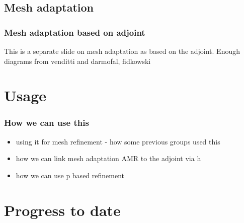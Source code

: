 \documentclass{beamer}
\begin{document}

\subsection{Mesh adaptation}
\begin{frame}
\scriptsize
\frametitle{Mesh adaptation based on adjoint}
This is a separate slide on mesh adaptation as based on the adjoint. Enough diagrams from venditti and darmofal, fidkowski
\end{frame}




\section[Usage]{Usage}

\begin{frame}%
\frametitle{How we can use this}
\scriptsize
\begin{itemize}
\item using it for mesh refinement - how some previous groups used this
\item how we can link mesh adaptation AMR to the adjoint via h
\item how we can use p based refinement
\end{itemize}
\end{frame}


\section[Progress]{Progress to date}
\end{document}
